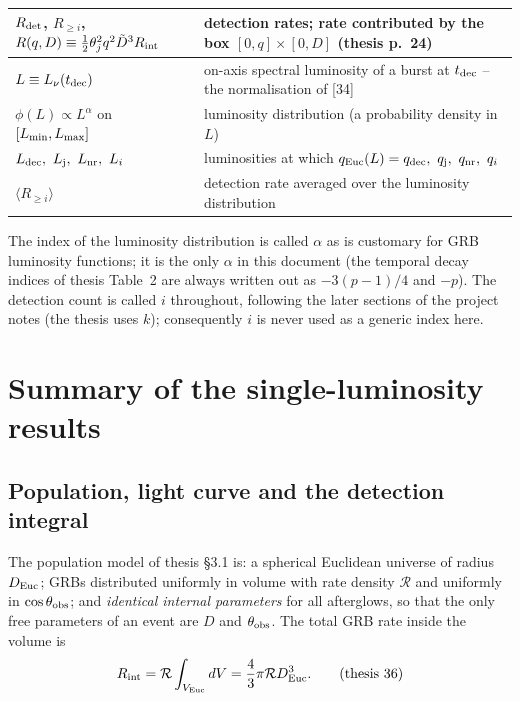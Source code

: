 \documentclass[11pt,a4paper]{article}
\newcommand{\tD}{\tilde{D}}
\newcommand{\Euc}{{\rm Euc}}
\newcommand{\dec}{{\rm dec}}
\newcommand{\nr}{{\rm nr}}
\newcommand{\Rint}{R_{\rm int}}
\newcommand{\Rdet}{R_{\rm det}}
\newcommand{\tdec}{t_{\rm dec}}
\newcommand{\Ravg}{\langle R_{\geq i}\rangle}
\newcommand{\Lmin}{L_{\rm min}}
\newcommand{\Lmax}{L_{\rm max}}
\newcommand{\Ldec}{L_{\rm dec}}
\newcommand{\Lj}{L_{\rm j}}
\newcommand{\Lnr}{L_{\rm nr}}
\newcommand{\Lnu}{L_\nu(t_{\rm dec})}
\begin{document}
\begin{center}
\begin{tabular}{@{}l p{8.3cm}@{}}
$\Rdet$,\; $R_{\geq i}$,\; $R(q,D)\equiv\tfrac12\theta_j^2q^2\tD^3\Rint$ & detection rates; rate contributed by the box $[0,q]\times[0,D]$ (thesis p.~24)\\
\midrule
$L\equiv\Lnu$ & on-axis spectral luminosity of a burst at $\tdec$ -- the normalisation of [34] \\
$\phi(L)\propto L^{\alpha}$ on $[\Lmin,\Lmax]$ & luminosity distribution (a probability density in $L$) \\
$\Ldec,\ \Lj,\ \Lnr,\ L_i$ & luminosities at which $q_\Euc(L)=q_\dec,\ q_{\rm j},\ q_\nr,\ q_i$ \\
$\Ravg$ & detection rate averaged over the luminosity distribution \\
\bottomrule
\end{tabular}
\end{center}

\noindent The index of the luminosity distribution is called $\alpha$ as is customary for GRB luminosity functions; it is the only $\alpha$ in this document (the temporal decay indices of thesis Table~2 are always written out as $-3(p-1)/4$ and $-p$). The detection count is called $i$ throughout, following the later sections of the project notes (the thesis uses $k$); consequently $i$ is never used as a generic index here.

\section{Summary of the single-luminosity results}
\label{sec:previous}

\subsection{Population, light curve and the detection integral}

The population model of thesis \S3.1 is: a spherical Euclidean universe of radius $D_\Euc$; GRBs distributed uniformly in volume with rate density $\mathcal R$ and uniformly in $\cos\theta_{\rm obs}$; and \emph{identical internal parameters} for all afterglows, so that the only free parameters of an event are $D$ and $\theta_{\rm obs}$. The total GRB rate inside the volume is
\begin{equation}
\Rint=\mathcal R\int_{V_\Euc}dV=\frac43\pi\mathcal R D_\Euc^3 . \tag{thesis 36}
\end{equation}
\end{document}
